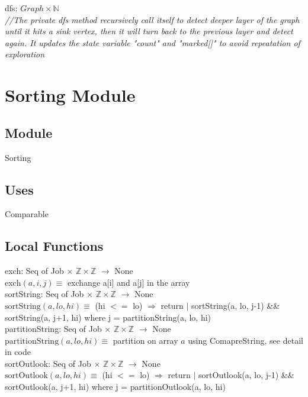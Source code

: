 \documentclass[12pt]{article}
\begin{document}
\noindent dfs: $Graph \times \mathbb{N}$\\
\noindent \textit{//The private dfs method recursively call itself to detect deeper layer of the graph until it hits a sink vertex, then it will turn back to the previous layer and detect again. It updates the state variable "count" and "marked[]" to avoid repeatation of exploration}\\

\newpage

\section* {Sorting Module}

\subsection* {Module}

Sorting

\subsection* {Uses}

Comparable

\subsection*{Local Functions}

\noindent exch: Seq of Job $\times$ $\mathbb{Z} \times \mathbb{Z}$  $ \rightarrow $ None\\
\noindent $\mbox{exch}(a, i, j) \equiv$ exchange a[i] and a[j] in the array\\

\noindent sortString: Seq of Job $\times$ $\mathbb{Z} \times \mathbb{Z}$ $ \rightarrow $ None\\
\noindent $\mbox{sortString}(a, lo, hi) \equiv$ (hi $<=$ lo) $\Rightarrow$ return $|$ sortString(a, lo, j-1) \&\& sortString(a, j+1, hi) where j = partitionString(a, lo, hi)\\

\noindent partitionString: Seq of Job $\times$ $\mathbb{Z} \times \mathbb{Z}$ $ \rightarrow $ None\\
\noindent $\mbox{partitionString}(a, lo, hi) \equiv$ partition on array $a$ using ComapreString, see detail in code\\

\noindent sortOutlook: Seq of Job $\times$ $\mathbb{Z} \times \mathbb{Z}$ $ \rightarrow $ None\\
\noindent $\mbox{sortOutlook}(a, lo, hi) \equiv$ (hi $<=$ lo) $\Rightarrow$ return $|$ sortOutlook(a, lo, j-1) \&\& sortOutlook(a, j+1, hi) where j = partitionOutlook(a, lo, hi)\\
\end{document}
